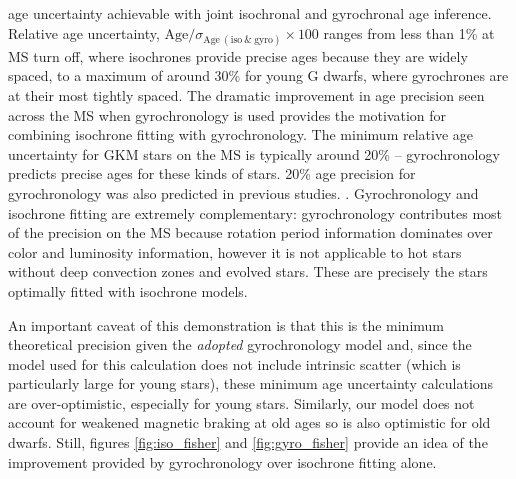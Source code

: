 age uncertainty achievable with joint isochronal and gyrochronal age
inference.
Relative age uncertainty,
$\mathrm{Age}/\sigma_{\mathrm{Age~(iso~\&~gyro)}}\times 100$ ranges from less
than 1\% at MS turn off, where isochrones provide precise ages because they
are widely spaced, to a maximum of around 30\% for young G dwarfs, where
gyrochrones are at their most tightly spaced.
The dramatic improvement in age precision seen across the MS when
gyrochronology is used provides the motivation for combining isochrone fitting
with gyrochronology.
The minimum relative age uncertainty for GKM stars on the MS is typically
around 20\% -- gyrochronology predicts precise ages for these kinds of stars.
20\% age precision for gyrochronology was also predicted in previous studies.
\citep{epstein2013}.
Gyrochronology and isochrone fitting are extremely complementary:
gyrochronology contributes most of the precision on the MS because rotation
period information dominates over color and luminosity information, however
it is not applicable to hot stars without deep convection zones
and evolved stars.
These are precisely the stars optimally fitted with isochrone models.

An important caveat of this demonstration is that this is the minimum
theoretical precision given the {\it adopted} gyrochronology model and, since
the model used for this calculation does not include intrinsic scatter (which
is particularly large for young stars), these minimum age uncertainty
calculations are over-optimistic, especially for young stars.
Similarly, our model does not account for weakened magnetic braking at old
ages \citep{vansaders2016} so is also optimistic for old dwarfs.
Still, figures \ref{fig:iso_fisher} and \ref{fig:gyro_fisher} provide an idea
of the improvement provided by gyrochronology over isochrone fitting alone.

